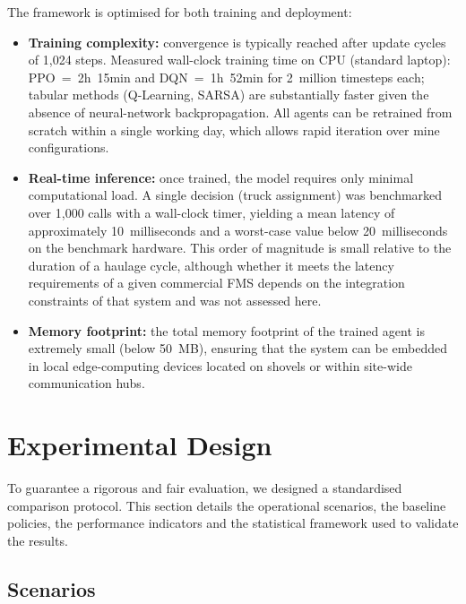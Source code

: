 \documentclass[11pt,a4paper]{article}
\begin{document}
The framework is optimised for both training and deployment:

\begin{itemize}
  \item \textbf{Training complexity:} convergence is typically reached after update cycles of 1,024 steps. Measured wall-clock training time on CPU (standard laptop): PPO~=~2h~15min and DQN~=~1h~52min for 2~million timesteps each; tabular methods (Q-Learning, SARSA) are substantially faster given the absence of neural-network backpropagation. All agents can be retrained from scratch within a single working day, which allows rapid iteration over mine configurations.
  \item \textbf{Real-time inference:} once trained, the model requires only minimal computational load. A single decision (truck assignment) was benchmarked over 1,000 calls with a wall-clock timer, yielding a mean latency of approximately 10~milliseconds and a worst-case value below 20~milliseconds on the benchmark hardware. This order of magnitude is small relative to the duration of a haulage cycle, although whether it meets the latency requirements of a given commercial FMS depends on the integration constraints of that system and was not assessed here.
  \item \textbf{Memory footprint:} the total memory footprint of the trained agent is extremely small (below 50~MB), ensuring that the system can be embedded in local edge-computing devices located on shovels or within site-wide communication hubs.
\end{itemize}

\section{Experimental Design}
\label{sec:design}


To guarantee a rigorous and fair evaluation, we designed a standardised comparison protocol. This section details the operational scenarios, the baseline policies, the performance indicators and the statistical framework used to validate the results.

\subsection{Scenarios}
\end{document}
